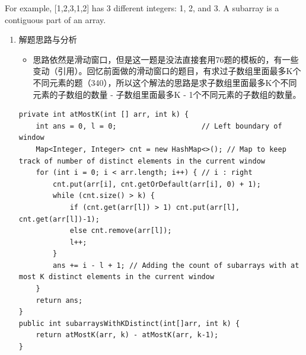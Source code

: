 \documentclass[9pt, b5paaper]{book}
\begin{document}
For example, [1,2,3,1,2] has 3 different integers: 1, 2, and 3.
A subarray is a contiguous part of an array.
\begin{enumerate}
\item 解题思路与分析
\label{sec-5-0-15-1}
\begin{itemize}
\item 思路依然是滑动窗口，但是这一题是没法直接套用76题的模板的，有一些变动（引用）。回忆前面做的滑动窗口的题目，有求过子数组里面最多K个不同元素的题（340），所以这个解法的思路是求子数组里面最多K个不同元素的子数组的数量 - 子数组里面最多K - 1个不同元素的子数组的数量。
\end{itemize}
\begin{verbatim}
private int atMostK(int [] arr, int k) {
    int ans = 0, l = 0;                    // Left boundary of window
    Map<Integer, Integer> cnt = new HashMap<>(); // Map to keep track of number of distinct elements in the current window
    for (int i = 0; i < arr.length; i++) { // i : right
        cnt.put(arr[i], cnt.getOrDefault(arr[i], 0) + 1);
        while (cnt.size() > k) {
            if (cnt.get(arr[l]) > 1) cnt.put(arr[l], cnt.get(arr[l])-1);
            else cnt.remove(arr[l]);
            l++;
        }
        ans += i - l + 1; // Adding the count of subarrays with at most K distinct elements in the current window
    }
    return ans;
}
public int subarraysWithKDistinct(int[]arr, int k) {
    return atMostK(arr, k) - atMostK(arr, k-1);
}
\end{verbatim}
\end{enumerate}
\end{document}
